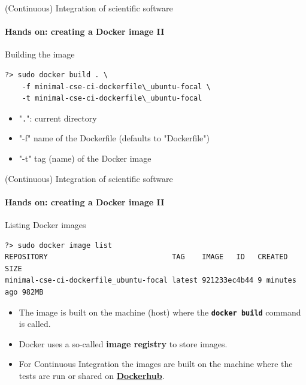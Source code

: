\begin{frame}[fragile]{(Continuous) Integration of scientific software} 
    \framesubtitle{Hands on: creating a Docker image II} 
    \vfill

    Building the image

\begin{verbatim}
?> sudo docker build . \
    -f minimal-cse-ci-dockerfile\_ubuntu-focal \
    -t minimal-cse-ci-dockerfile\_ubuntu-focal
\end{verbatim}

\begin{itemize}
    \item "\texttt{.}": current directory
    \item "-f" name of the Dockerfile (defaults to "Dockerfile")
    \item "-t" tag (name) of the Docker image
\end{itemize}

\end{frame}

\begin{frame}[fragile]{(Continuous) Integration of scientific software} 
    \framesubtitle{Hands on: creating a Docker image II} 
    \vfill

    Listing Docker images

    \begin{verbatim}
?> sudo docker image list
REPOSITORY                             TAG    IMAGE   ID   CREATED        SIZE
minimal-cse-ci-dockerfile_ubuntu-focal latest 921233ec4b44 9 minutes ago 982MB
    \end{verbatim}

    \begin{itemize}
        \item The image is built on the machine (host) where the \textbf{\texttt{docker build}} command is called. 
        \item Docker uses a so-called \textbf{image registry} to store images.
        \item For Continuous Integration the images are built on the machine where the tests are run or shared on \href{https://hub.docker.com/}{\textbf{Dockerhub}}.
    \end{itemize}

\end{frame}

